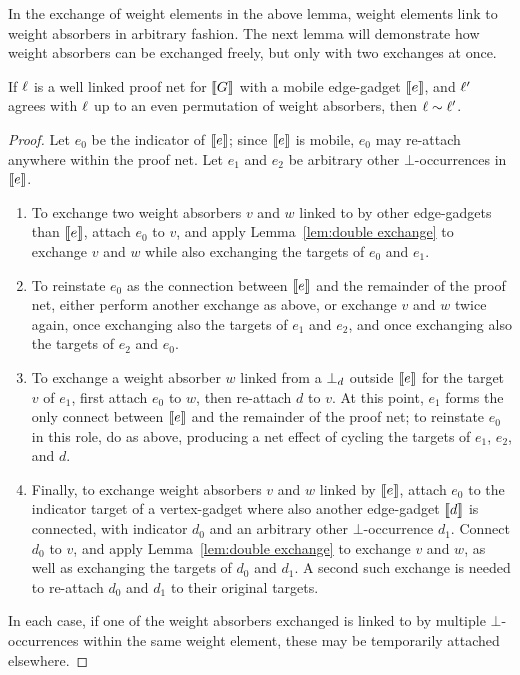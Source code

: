 \documentclass{sigplanconf}
\begin{document}
In the exchange of weight elements in the above lemma, weight elements link to weight absorbers in arbitrary fashion.
%
The next lemma will demonstrate how weight absorbers can be exchanged freely, but only with two exchanges at once. 



\begin{lemma}
\label{lem:permute weight absorbers}
If $\ell$ is a well linked proof net for $\llbracket G\rrbracket$ with a mobile edge-gadget $\llbracket e\rrbracket$, and $\ell'$ agrees with $\ell$ up to an even permutation of weight absorbers, then $\links\perm\links'$.
\end{lemma}

\begin{proof}
Let $e_0$ be the indicator of $\llbracket e\rrbracket$; since $\llbracket e\rrbracket$ is mobile, $e_0$ may re-attach anywhere within the proof net.
%
Let $e_1$ and $e_2$ be arbitrary other $\bot$-occurrences in $\llbracket e\rrbracket$.

\begin{enumerate}

	\item
To exchange two weight absorbers $v$ and $w$ linked to by other edge-gadgets than $\llbracket e\rrbracket$, attach $e_0$ to $v$, and apply Lemma~\ref{lem:double exchange} to exchange $v$ and $w$ while also exchanging the targets of $e_0$ and $e_1$.

	\item
To reinstate $e_0$ as the connection between $\llbracket e\rrbracket$ and the remainder of the proof net, either perform another exchange as above, or exchange $v$ and $w$ twice again, once exchanging also the targets of $e_1$ and $e_2$, and once exchanging also the targets of $e_2$ and $e_0$.

	\item
To exchange a weight absorber $w$ linked from a $\bot_{d}$ outside $\llbracket e\rrbracket$ for the target $v$ of $e_1$, first attach $e_0$ to $w$, then re-attach $d$ to $v$.
%
At this point, $e_1$ forms the only connect between $\llbracket e\rrbracket$ and the remainder of the proof net; to reinstate $e_0$ in this role, do as above, producing a net effect of cycling the targets of $e_1$, $e_2$, and $d$.

	\item
Finally, to exchange weight absorbers $v$ and $w$ linked by $\llbracket e\rrbracket$, attach $e_0$ to the indicator target of a vertex-gadget where also another edge-gadget $\llbracket d\rrbracket$ is connected, with indicator $d_0$ and an arbitrary other $\bot$-occurrence $d_1$.
%
Connect $d_0$ to $v$, and apply Lemma~\ref{lem:double exchange} to exchange $v$ and $w$, as well as exchanging the targets of $d_0$ and $d_1$.
%
A second such exchange is needed to re-attach $d_0$ and $d_1$ to their original targets.

\end{enumerate}

In each case, if one of the weight absorbers exchanged is linked to by multiple $\bot$-occurrences within the same weight element, these may be temporarily attached elsewhere.
%
\end{proof}
\end{document}
